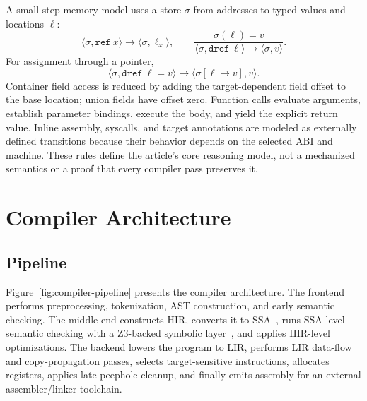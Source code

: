 \documentclass[10pt,twocolumn]{article}
\begin{document}
\par A small-step memory model uses a store \(\sigma\) from addresses to typed values and locations \(\ell\):
\[
\langle \sigma,\texttt{ref}\ x\rangle \rightarrow
\langle \sigma,\ell_x\rangle,
\qquad
\frac{\sigma(\ell)=v}
     {\langle \sigma,\texttt{dref}\ \ell\rangle \rightarrow
      \langle \sigma,v\rangle}.
\]
For assignment through a pointer,
\[
\langle \sigma,\texttt{dref}\ \ell = v\rangle \rightarrow
\langle \sigma[\ell \mapsto v],v\rangle.
\]
Container field access is reduced by adding the target-dependent field offset to the base location; union fields have offset zero. Function calls evaluate arguments, establish parameter bindings, execute the body, and yield the explicit return value. Inline assembly, syscalls, and target annotations are modeled as externally defined transitions because their behavior depends on the selected ABI and machine. These rules define the article's core reasoning model, not a mechanized semantics or a proof that every compiler pass preserves it.

\section{Compiler Architecture}

\subsection{Pipeline}

\par Figure~\ref{fig:compiler-pipeline} presents the compiler architecture. The frontend performs preprocessing, tokenization, AST construction, and early semantic checking. The middle-end constructs HIR, converts it to SSA~\cite{cytron1991ssa}, runs SSA-level semantic checking with a Z3-backed symbolic layer~\cite{deMoura2008z3}, and applies HIR-level optimizations. The backend lowers the program to LIR, performs LIR data-flow and copy-propagation passes, selects target-sensitive instructions, allocates registers, applies late peephole cleanup, and finally emits assembly for an external assembler/linker toolchain.
\end{document}
